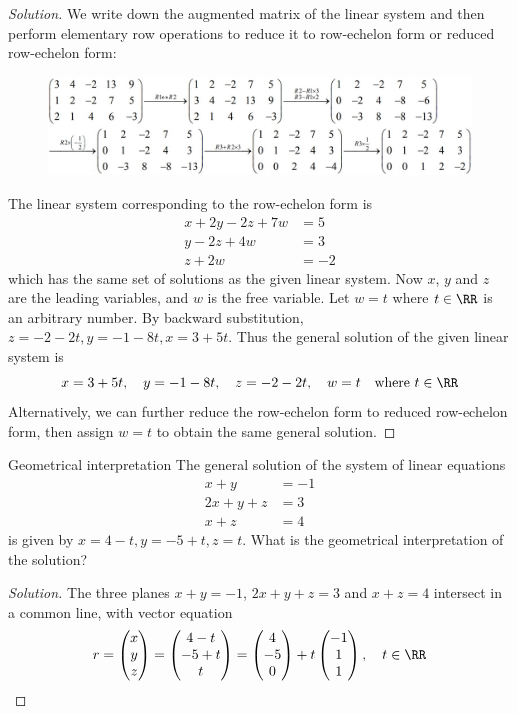 \begin{proof}[Solution]
We write down the augmented matrix of the linear system and then perform elementary row operations to reduce it to row-echelon form or reduced row-echelon form:
\begin{figure}[H]
    \centering
    \includegraphics[width=16cm]{images/matrix_1.jpg}
\end{figure}
The linear system corresponding to the row-echelon form is
\begin{align*}
x + 2y - 2z + 7w &= 5 \\
y - 2z + 4w &= 3 \\
z + 2w &= -2
\end{align*}
which has the same set of solutions as the given linear system. Now $x$, $y$ and $z$ are the leading variables, and $w$ is the free variable. Let $w=t$ where $t\in\RR$ is an arbitrary number. By backward substitution, $z=-2-2t, y=-1-8t, x=3+5t$. Thus the general solution of the given linear system is
\[ x=3+5t, \quad y=-1-8t, \quad z=-2-2t, \quad w=t \quad \text{where } t\in\RR \]
Alternatively, we can further reduce the row-echelon form to reduced row-echelon form, then assign $w=t$ to obtain the same general solution.
\end{proof}

\begin{exmp}{Geometrical interpretation}{}
The general solution of the system of linear equations
\begin{align*}
x + y &= -1 \\
2x + y + z &= 3 \\
x + z &= 4
\end{align*}
is given by $x=4-t, y=-5+t, z=t$. What is the geometrical interpretation of the solution?
\end{exmp}

\begin{proof}[Solution]
The three planes $x+y=-1$, $2x+y+z=3$ and $x+z=4$ intersect in a common line, with vector equation
\[ r = \begin{pmatrix} x \\ y \\ z \end{pmatrix} 
= \begin{pmatrix} 4-t \\ -5+t \\ t \end{pmatrix} 
= \begin{pmatrix} 4 \\ -5 \\ 0 \end{pmatrix} + t\begin{pmatrix} -1 \\ 1 \\ 1 \end{pmatrix}, \quad t\in\RR \]
\end{proof}

